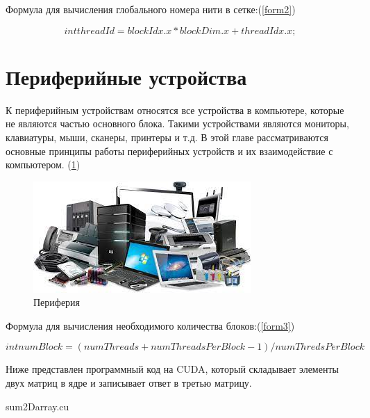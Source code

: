 \documentclass[a4paper, 14pt]{report}
\begin{document}
	Формула для вычисления глобального номера нити в сетке:(\ref{form2})
	
	\begin{equation}
		int threadId = blockIdx.x *blockDim.x + threadIdx.x;
		\label{form2}
	\end{equation}

		\section{Периферийные устройства}
	К периферийным устройствам относятся все устройства в компьютере, которые не являются частью основного блока. Такими устройствами являются мониторы, клавиатуры, мыши, сканеры, принтеры и т.д. В этой главе рассматриваются основные принципы работы периферийных устройств и их взаимодействие с компьютером.  \cite{farber2011cuda} (\ref{cuda3})
	
	\begin{figure}[h]
		\centering
		\includegraphics[scale=0.7]{ap.png}
		\caption{Периферия}
		\label{cuda3}
	\end{figure}
	
	Формула для вычисления необходимого количества блоков:(\ref{form3})
	
	\begin{equation}
		int numBlock = (numThreads + numThreadsPerBlock - 1) / numThredsPerBlock
		\label{form3}
	\end{equation}

	Ниже представлен программный код на CUDA, который складывает элементы двух матриц в ядре и записывает ответ в третью матрицу.\newline\newline
	
	sum2Darray.cu
	
	
	\printbibliography
\end{document}
